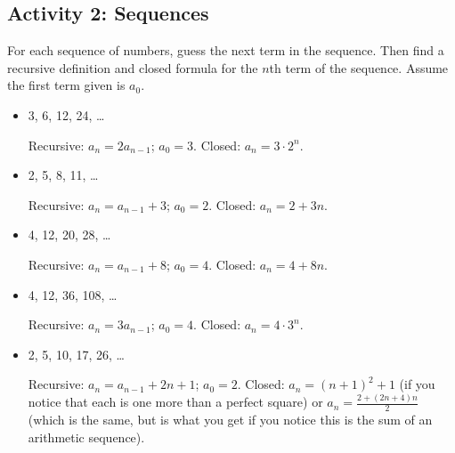 \documentclass[11pt]{exam}
\begin{document}
\newpage

\subsection*{Activity 2: Sequences}

For each sequence of numbers, guess the next term in  the sequence.  Then find a recursive definition and closed formula for the $n$th term of the sequence.  Assume the first term given is $a_0$.

\begin{itemize}
\item 3, 6, 12, 24, \ldots
\begin{solution}
Recursive: $a_n = 2a_{n-1}$; $a_0 = 3$.  Closed: $a_n = 3 \cdot 2^n$.
\end{solution}
\vfill
\item 2, 5, 8, 11, \ldots
\begin{solution}
Recursive: $a_n = a_{n-1} + 3$; $a_0 = 2$.  Closed: $a_n = 2 + 3n$.
\end{solution}
\vfill
\item 4, 12, 20, 28, \ldots
\begin{solution}
Recursive: $a_n = a_{n-1} + 8$; $a_0 = 4$.  Closed: $a_n = 4 + 8n$.
\end{solution}
\vfill
\item 4, 12, 36, 108, \ldots
\begin{solution}
Recursive: $a_n = 3a_{n-1}$; $a_0 = 4$.  Closed: $a_n = 4\cdot 3^n$.
\end{solution}
\vfill
\item 2, 5, 10, 17, 26, \ldots
\begin{solution}
Recursive: $a_n = a_{n-1} + 2n+1$; $a_0 = 2$.  Closed: $a_n = (n+1)^2 + 1$ (if you notice that each is one more than a perfect square) or $a_n = \frac{2+(2n+4)n}{2}$ (which is the same, but is what you get if you notice this is the sum of an arithmetic sequence).
\end{solution}
\vfill
\end{itemize}
\end{document}
